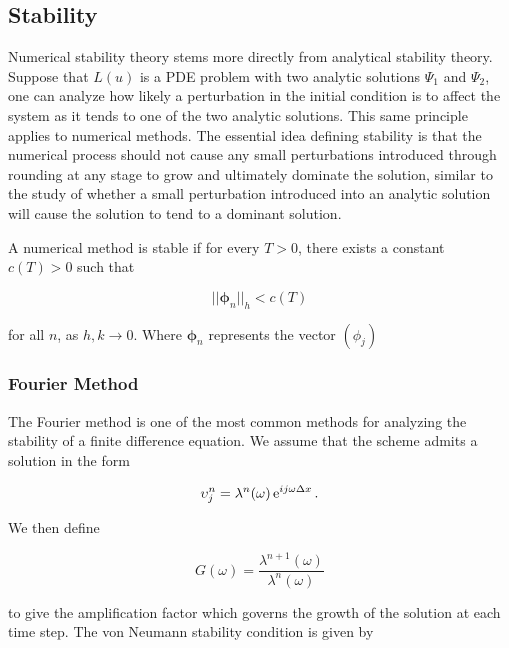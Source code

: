\documentclass[../main.tex]{subfiles}
\begin{document}
  \subsection{Stability}
  Numerical stability theory stems more directly from analytical stability theory. Suppose that $L(u)$ is a PDE problem with two analytic solutions $\Psi_1$ and $\Psi_2$, one can analyze how likely a perturbation in the initial condition is to affect the system as it tends to one of the two analytic solutions. This same principle applies to numerical methods. The essential idea defining stability is that the numerical process should not cause any small perturbations introduced through rounding at any stage to grow and ultimately dominate the solution, similar to the study of whether a small perturbation introduced into an analytic solution will cause the solution to tend to a dominant solution.

  \begin{definition}
    A numerical method is stable if for every $T > 0$, there exists a constant $c(T) > 0$ such that

    \begin{equation}
      || \boldsymbol\phi_n ||_h < c(T)
    \end{equation}

    for all $n$, as $h, k \to 0$. Where $\boldsymbol\phi_n$ represents the vector $( \phi_j )$
  \end{definition}

  \subsubsection{Fourier Method}
  The Fourier method is one of the most common methods for analyzing the stability of a finite difference equation. We assume that the scheme admits a solution in the form

  \begin{equation}
    \upsilon^n_j = \lambda^n(\omega) \operatorname{e}^{i j \omega \Delta x}.
  \end{equation}

  We then define

  \begin{equation}
    G(\omega) = \frac{\lambda^{n+1}(\omega)}{\lambda^n(\omega)}
  \end{equation}

  to give the amplification factor which governs the growth of the solution at each time step. The von Neumann stability condition is given by
\end{document}
